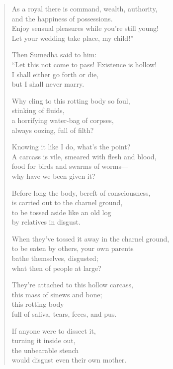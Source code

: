 \documentclass[12pt,openany]{book}%
\begin{document}
\begin{verse}
As a royal there is command, wealth, authority, \\
and the happiness of possessions. \\
Enjoy sensual pleasures while you’re still young! \\
Let your wedding take place, my child!” 

Then \textsanskrit{Sumedhā} said to him: \\
“Let this not come to pass! Existence is hollow! \\
I shall either go forth or die, \\
but I shall never marry. 

Why cling to this rotting body so foul, \\
stinking of fluids, \\
a horrifying water-bag of corpses, \\
always oozing, full of filth? 

Knowing it like I do, what’s the point? \\
A carcass is vile, smeared with flesh and blood, \\
food for birds and swarms of worms—\\
why have we been given it? 

Before long the body, bereft of consciousness, \\
is carried out to the charnel ground, \\
to be tossed aside like an old log \\
by relatives in disgust. 

When they’ve tossed it away in the charnel ground, \\
to be eaten by others, your own parents \\
bathe themselves, disgusted; \\
what then of people at large? 

They’re attached to this hollow carcass, \\
this mass of sinews and bone; \\
this rotting body \\
full of saliva, tears, feces, and pus. 

If anyone were to dissect it, \\
turning it inside out, \\
the unbearable stench \\
would disgust even their own mother. 


\end{verse}
\end{document}
